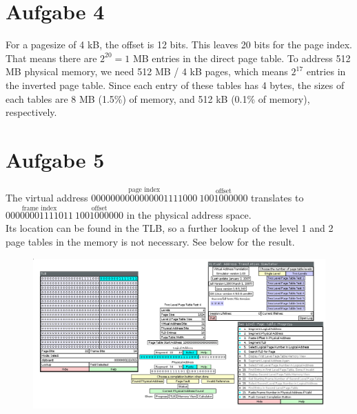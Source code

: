 \documentclass{article}
\begin{document}
\section*{Aufgabe 4}
For a pagesize of 4 kB, the offset is 12 bits. This leaves 20 bits
for the page index. That means there are \( 2 ^{20} = 1\) MB entries
in the direct page table. To address 512 MB physical memory, we need
512 MB / 4 kB pages, which means \( 2 ^{17} \) entries in the inverted page table.
Since each entry of these tables has 4 bytes, the sizes of each tables
are 8 MB (1.5\%) of memory, and 512 kB (0.1\% of memory), respectively.

\section*{Aufgabe 5}

The virtual address \( \overset{\text{page index}}{0000000000000001111000} \
    \overset{\text{offset}}{1001000000} \) translates to
\( \overset{\text{frame index}}{00000001111011} \
    \overset{\text{offset}}{1001000000}\) in the physical address space. \\
Its location can be found in the TLB, so a further lookup of the level 1 and 2
page tables in the memory is not necessary. See below for the result.
\begin{figure}[H]
    \centering
    \includegraphics[width=\textwidth]{address.png}
\end{figure}
\end{document}
